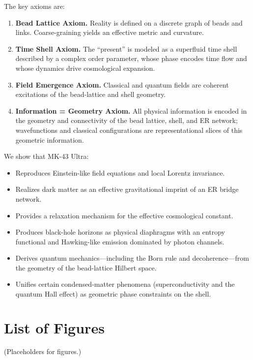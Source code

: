 The key axioms are:

\begin{enumerate}[label=\textbf{A\arabic*}.]
    \item \textbf{Bead Lattice Axiom.} Reality is defined on a discrete graph of beads and links. Coarse-graining yields an effective metric and curvature.
    \item \textbf{Time Shell Axiom.} The ``present'' is modeled as a superfluid time shell described by a complex order parameter, whose phase encodes time flow and whose dynamics drive cosmological expansion.
    \item \textbf{Field Emergence Axiom.} Classical and quantum fields are coherent excitations of the bead-lattice and shell geometry.
    \item \textbf{Information = Geometry Axiom.} All physical information is encoded in the geometry and connectivity of the bead lattice, shell, and ER network; wavefunctions and classical configurations are representational slices of this geometric information.
\end{enumerate}

We show that MK-43 Ultra:
\begin{itemize}
    \item Reproduces Einstein-like field equations and local Lorentz invariance.
    \item Realizes dark matter as an effective gravitational imprint of an ER bridge network.
    \item Provides a relaxation mechanism for the effective cosmological constant.
    \item Produces black-hole horizons as physical diaphragms with an entropy functional and Hawking-like emission dominated by photon channels.
    \item Derives quantum mechanics---including the Born rule and decoherence---from the geometry of the bead-lattice Hilbert space.
    \item Unifies certain condensed-matter phenomena (superconductivity and the quantum Hall effect) as geometric phase constraints on the shell.
\end{itemize}

\tableofcontents

\chapter*{List of Figures}
(Placeholders for figures.)

